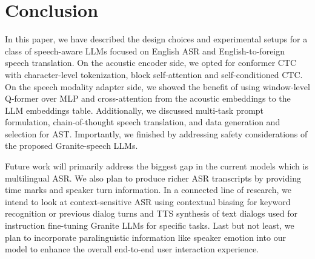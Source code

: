 \documentclass[9pt,conference]{IEEEtran}
\begin{document}
\section{Conclusion}
\label{sec:conclusion}
In this paper, we have described the design choices and experimental setups for a class of speech-aware LLMs focused on English ASR and English-to-foreign speech translation. On the acoustic encoder side, we opted for conformer CTC with character-level tokenization, block self-attention and self-conditioned CTC. On the speech modality adapter side, we showed the benefit of using window-level Q-former over MLP and cross-attention from the acoustic embeddings to the LLM embeddings table. Additionally, we discussed multi-task prompt formulation, chain-of-thought speech translation, and data generation and selection for AST. Importantly, we finished by addressing safety considerations of the proposed Granite-speech LLMs. 

Future work will primarily address the biggest gap in the current models which is multilingual ASR. We also plan to produce richer ASR transcripts by providing time marks and speaker turn information. In a connected line of research, we intend to look at context-sensitive ASR using contextual biasing for keyword recognition or previous dialog turns and TTS synthesis of text dialogs used for instruction fine-tuning Granite LLMs for specific tasks. Last but not least, we plan to incorporate paralinguistic information like speaker emotion into our model to enhance the overall end-to-end user interaction experience.



\end{document}
